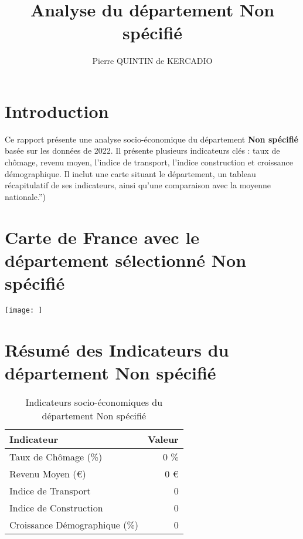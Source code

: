 \documentclass[
]{article}
\title{Analyse du département Non spécifié}
\author{Pierre QUINTIN de KERCADIO}
\date{}
\begin{document}
\maketitle

\section{Introduction}\label{introduction}

Ce rapport présente une analyse socio-économique du département
\textbf{Non spécifié} basée sur les données de 2022. Il présente
plusieurs indicateurs clés : taux de chômage, revenu moyen, l'indice de
transport, l'indice construction et croissance démographique. Il inclut
une carte situant le département, un tableau récapitulatif de ses
indicateurs, ainsi qu'une comparaison avec la moyenne nationale.'')

\section{\texorpdfstring{\textbf{Carte de France avec le département
sélectionné Non
spécifié}}{Carte de France avec le département sélectionné Non spécifié}}\label{carte-de-france-avec-le-duxe9partement-suxe9lectionnuxe9-non-spuxe9cifiuxe9}

\begin{center}
\texttt{[image: ]}
\end{center}

\newpage

\section{\texorpdfstring{\textbf{Résumé des Indicateurs du département
Non
spécifié}}{Résumé des Indicateurs du département Non spécifié}}\label{ruxe9sumuxe9-des-indicateurs-du-duxe9partement-non-spuxe9cifiuxe9}

\begin{table}[h]
\centering
\renewcommand{\arraystretch}{1.3} %
\begin{tabular}{|l|r|}
\hline
Indicateur & Valeur \\
\hline
Taux de Chômage (\%) & 0 \% \\
Revenu Moyen (€) & 0 € \\
Indice de Transport & 0 \\
Indice de Construction  & 0 \\
Croissance Démographique (\%) & 0 \\
\hline
\end{tabular}
\caption{Indicateurs socio-économiques du département Non spécifié}
\end{table}
\end{document}
